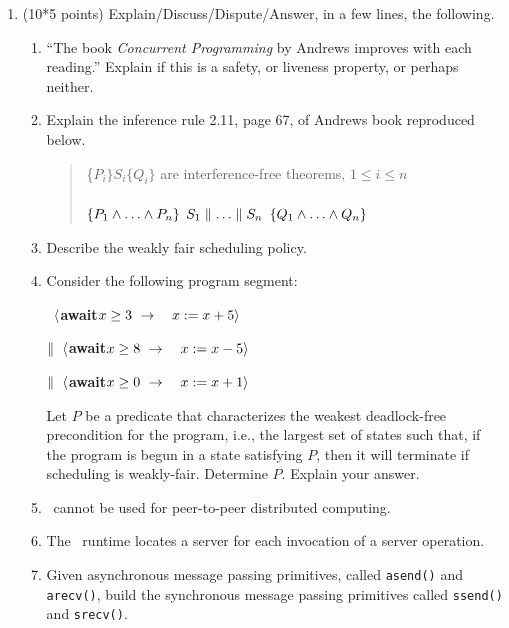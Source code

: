 \begin{enumerate}

\item (10*5 points)
Explain/Discuss/Dispute/Answer, in a few lines, the following.


\begin{enumerate}
\item ``The book {\sl Concurrent Programming} by Andrews improves
with each reading.''  Explain if this is a safety, or liveness
property, or perhaps neither.

\item
Explain the inference rule 2.11, page 67, of Andrews book reproduced
below.
\begin{quote}
\begin{centering}
\{$P_i\} S_i \{Q_i\}$ are interference-free theorems, $1 \leq i \leq
n$\\[-8pt]
~\hrulefill\\[-4pt]
$\{P_1 \wedge \ldots \wedge P_n\}$
\co\quad $S_1 \parallel \ldots \parallel S_n$ \quad\oc
$\{Q_1 \wedge \ldots \wedge Q_n\}$\par
\end{centering}
\end{quote}
\item Describe the weakly fair scheduling policy.

\item
Consider the following program segment:

\def\await{{\bf await}}
\co\  $\langle $\await\quad $x \geq 3 \ \rightarrow\quad x := x + 5 \rangle$\par
$\parallel\  \langle $\await\quad $x \geq 8 \ \rightarrow\quad x := x - 5 \rangle$\par
$\parallel\  \langle $\await\quad $x \geq 0 \ \rightarrow\quad x := x + 1 \rangle$\par
\oc\par

Let $P$ be a predicate that characterizes the weakest deadlock-free
precondition for the program, i.e., the largest set of states such
that, if the program is begun in a state satisfying $P$, then it will
terminate if scheduling is weakly-fair.  Determine $P$.  Explain your
answer.

\item
\RPC\ cannot be used for peer-to-peer distributed computing.

\item
The \RPC\ runtime locates a server for each invocation
of a server operation.

\item
Given asynchronous message passing primitives, called {\tt asend()}
and {\tt arecv()}, build the synchronous message passing primitives
called {\tt ssend()} and {\tt srecv()}.


\end{enumerate}
\end{enumerate}
